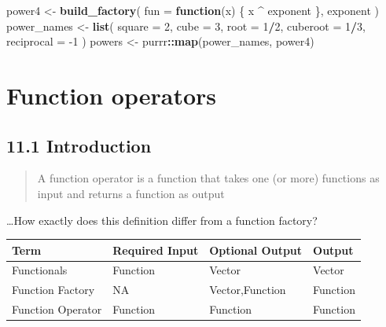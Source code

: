 \documentclass[]{book}
\newenvironment{Shaded}{\begin{snugshade}}{\end{snugshade}}
\newcommand{\ControlFlowTok}[1]{\textcolor[rgb]{0.13,0.29,0.53}{\textbf{#1}}}
\newcommand{\DataTypeTok}[1]{\textcolor[rgb]{0.13,0.29,0.53}{#1}}
\newcommand{\DecValTok}[1]{\textcolor[rgb]{0.00,0.00,0.81}{#1}}
\newcommand{\KeywordTok}[1]{\textcolor[rgb]{0.13,0.29,0.53}{\textbf{#1}}}
\newcommand{\NormalTok}[1]{#1}
\newcommand{\OperatorTok}[1]{\textcolor[rgb]{0.81,0.36,0.00}{\textbf{#1}}}
\newcommand{\StringTok}[1]{\textcolor[rgb]{0.31,0.60,0.02}{#1}}
\begin{document}
\begin{Shaded}
\begin{Highlighting}[]
\NormalTok{power4 <-}\StringTok{ }\KeywordTok{build_factory}\NormalTok{(}
  \DataTypeTok{fun =} \ControlFlowTok{function}\NormalTok{(x) \{}
\NormalTok{    x }\OperatorTok{^}\StringTok{ }\NormalTok{exponent}
\NormalTok{  \},}
\NormalTok{  exponent}
\NormalTok{)}
\NormalTok{power_names <-}\StringTok{ }\KeywordTok{list}\NormalTok{(}
  \DataTypeTok{square =} \DecValTok{2}\NormalTok{,}
  \DataTypeTok{cube =} \DecValTok{3}\NormalTok{,}
  \DataTypeTok{root =} \DecValTok{1}\OperatorTok{/}\DecValTok{2}\NormalTok{,}
  \DataTypeTok{cuberoot =} \DecValTok{1}\OperatorTok{/}\DecValTok{3}\NormalTok{,}
  \DataTypeTok{reciprocal =} \DecValTok{-1}
\NormalTok{)}
\NormalTok{powers <-}\StringTok{ }\NormalTok{purrr}\OperatorTok{::}\KeywordTok{map}\NormalTok{(power_names, power4)}
\end{Highlighting}
\end{Shaded}

\hypertarget{function-operators}{%
\chapter{Function operators}\label{function-operators}}

\hypertarget{introduction-1}{%
\section*{11.1 Introduction}\label{introduction-1}}

\begin{quote}
A function operator is a function that takes one (or more) functions as input and returns a function as output
\end{quote}

\ldots{}How exactly does this definition differ from a function factory?

\captionsetup[table]{labelformat=empty,skip=1pt}
\begin{longtable}{llll}
\toprule
Term & Required Input & Optional Output & Output \\ 
\midrule
Functionals & Function & Vector & Vector \\ 
Function Factory & NA & Vector,Function & Function \\ 
Function Operator & Function & Function & Function \\ 
\bottomrule
\end{longtable}
\end{document}
